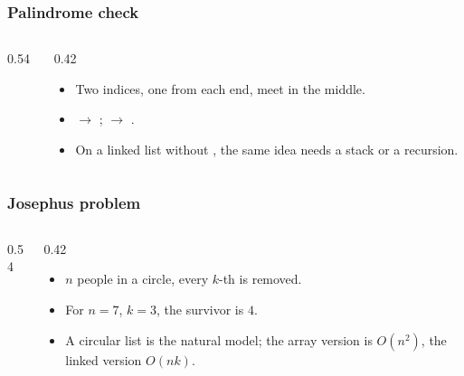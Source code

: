 \documentclass[aspectratio=169,10pt,compress]{beamer}
\begin{document}
\begin{frame}[t,fragile] \frametitle{Palindrome check}
  \begin{columns}[T]
    \begin{column}{0.54\textwidth}
    \end{column}
    \begin{column}{0.42\textwidth}
      \small
      \begin{itemize}
        \item Two indices, one from each end, meet in the middle.
        \item {} $\to$ ;
               $\to$ .
        \item On a linked list without , the same idea
              needs a stack or a recursion.
      \end{itemize}
    \end{column}
  \end{columns}
\end{frame}




\begin{frame}[t,fragile] \frametitle{Josephus problem}
  \begin{columns}[T]
    \begin{column}{0.54\textwidth}
    \end{column}
    \begin{column}{0.42\textwidth}
      \small
      \begin{itemize}
        \item $n$ people in a circle, every $k$-th is removed.
        \item For $n = 7$, $k = 3$, the survivor is $4$.
        \item A circular list is the natural model; the array version
              is $O(n^2)$, the linked version $O(nk)$.
      \end{itemize}
    \end{column}
  \end{columns}
\end{frame}
\end{document}
